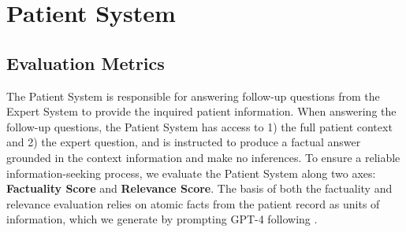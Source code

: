 \appendix
\section{Patient System}\label{app:patient_prompts}


\subsection{Evaluation Metrics}\label{app:patient:metrics}
The Patient System is responsible for answering follow-up questions from the Expert System to provide the inquired patient information. 
When answering the follow-up questions, the Patient System has access to 1) the full patient context and 2) the expert question, and is instructed to produce a factual answer grounded in the context information and make no inferences. To ensure a reliable information-seeking process, we evaluate the Patient System along two axes: \textbf{Factuality Score} and \textbf{Relevance Score}. The basis of both the factuality and relevance evaluation relies on atomic facts from the patient record as units of information, which we generate by prompting GPT-4 following \cite{min2023factscore}.

